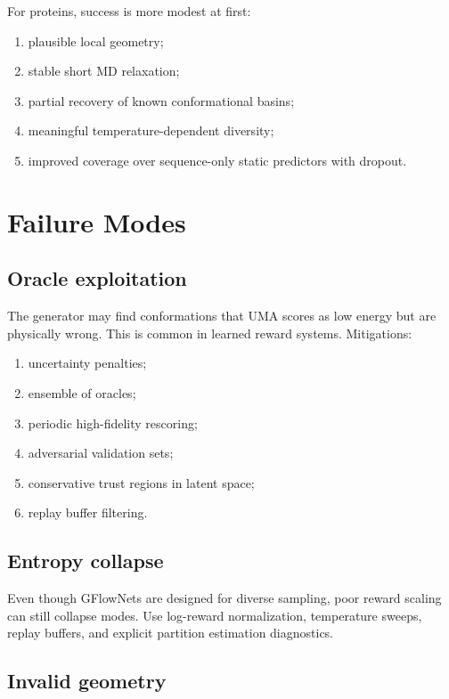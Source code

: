 \documentclass[11pt]{article}
\begin{document}
For proteins, success is more modest at first:
\begin{enumerate}[leftmargin=2em]
  \item plausible local geometry;
  \item stable short MD relaxation;
  \item partial recovery of known conformational basins;
  \item meaningful temperature-dependent diversity;
  \item improved coverage over sequence-only static predictors with dropout.
\end{enumerate}

\section{Failure Modes}

\subsection{Oracle exploitation}

The generator may find conformations that UMA scores as low energy but are physically wrong. This is common in learned reward systems. Mitigations:
\begin{enumerate}[leftmargin=2em]
  \item uncertainty penalties;
  \item ensemble of oracles;
  \item periodic high-fidelity rescoring;
  \item adversarial validation sets;
  \item conservative trust regions in latent space;
  \item replay buffer filtering.
\end{enumerate}

\subsection{Entropy collapse}

Even though GFlowNets are designed for diverse sampling, poor reward scaling can still collapse modes. Use log-reward normalization, temperature sweeps, replay buffers, and explicit partition estimation diagnostics.

\subsection{Invalid geometry}
\end{document}
